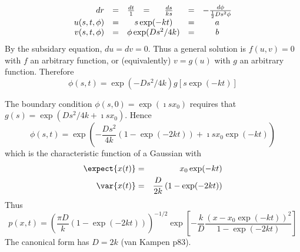 \documentclass{beamer}
\begin{document}
\begin{frame}{}
\[
\begin{array}{rccccccl}
dr & = & \frac{dt}{1} & = & \frac{ds}{ks} & = & -\frac{d\phi}{\frac{1}{2} Ds^2 \phi} \\
u(s,t,\phi) & = & \multicolumn{3}{c}{s\exp(-kt)} & = & a \\
v(s,t,\phi) & = & \multicolumn{3}{c}{\phi\exp(Ds^2/4k)} & = & b
\end{array}
\]
By the subsidary equation, $du=dv=0$.
Thus a general solution %
is $f(u,v)=0$ with $f$ an arbitrary function,
or (equivalently) $v=g(u)$ with $g$ an arbitrary function.
Therefore
\[
\phi(s,t) = \exp(-Ds^2/4k) g\left[ s \exp(-kt) \right]
\]
\end{frame}
\begin{frame}{}
The boundary condition $\phi(s,0)=\exp(\imath sx_0)$ requires that $g(s) = \exp(Ds^2/4k + \imath sx_0)$.
Hence
\[
\phi(s,t) = \exp \left( -\frac{Ds^2}{4k} (1 - \exp(-2kt))  + \imath sx_0 \exp(-kt) \right)
\]
which is the characteristic function of a Gaussian with
\begin{eqnarray*}
\expect{x(t)} & = & x_0 \exp(-kt) \\
\var{x(t)} & = & \frac{D}{2k} \left( 1 - \exp(-2kt) \right)
\end{eqnarray*}
Thus
\[
p(x,t) = \left( \frac{\pi D}{k}(1-\exp(-2kt)) \right)^{-1/2} \exp \left[ -\frac{k}{D} \frac{(x - x_0 \exp(-kt))^2}{1-\exp(-2kt)} \right]
\]
The canonical form has $D=2k$ (van Kampen p83).
\end{frame}



%   
%   
%   
%  
\end{document}
